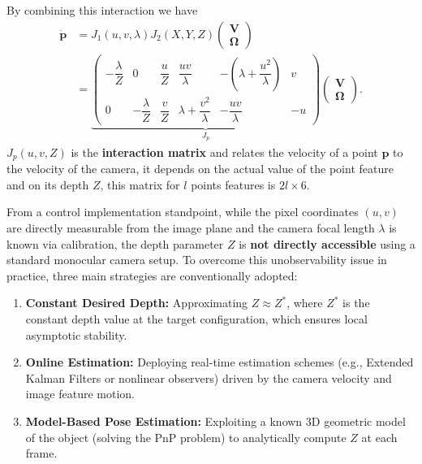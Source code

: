 \documentclass[10pt, a4paper]{report}
\begin{document}
By combining this interaction we have\begin{align}
    \dot{\mathbf p}&=J_1(u,v,\lambda)J_2(X,Y,Z)\begin{pmatrix}
         \mathbf V\\\boldsymbol{\Omega}
    \end{pmatrix}\\[1.5ex]
    &=\underbrace{\begin{pmatrix}
-\dfrac{\lambda}{Z} & 0 & \dfrac{u}{Z} & \dfrac{uv}{\lambda} & -\left(\lambda + \dfrac{u^2}{\lambda}\right) & v \\
0 & -\dfrac{\lambda}{Z} & \dfrac{v}{Z} & \lambda + \dfrac{v^2}{\lambda} & -\dfrac{uv}{\lambda} & -u
\end{pmatrix}}_{J_p}\begin{pmatrix}
         \mathbf V\\\boldsymbol{\Omega}
    \end{pmatrix}.
\end{align}
$J_p(u,v,Z)$ is the \textbf{interaction matrix} and relates the velocity of a point $\mathbf p$ to the velocity of the camera, it depends on the actual value of the point feature and on its depth $Z$, this matrix for $l$ points features is $2l\times 6$.
\begin{boxobservation}{}{}
    From a control implementation standpoint, while the pixel coordinates $(u, v)$ are directly measurable from the image plane and the camera focal length $\lambda$ is known via calibration, the depth parameter $Z$ is \textbf{not directly accessible} using a standard monocular camera setup.
    To overcome this unobservability issue in practice, three main strategies are conventionally adopted:
\begin{enumerate}
    \item \textbf{Constant Desired Depth:} Approximating $Z \approx Z^*$, where $Z^*$ is the constant depth value at the target configuration, which ensures local asymptotic stability.
    \item \textbf{Online Estimation:} Deploying real-time estimation schemes (e.g., Extended Kalman Filters or nonlinear observers) driven by the camera velocity and image feature motion.
    \item \textbf{Model-Based Pose Estimation:} Exploiting a known 3D geometric model of the object (solving the PnP problem) to analytically compute $Z$ at each frame.
\end{enumerate}
\end{boxobservation}
\end{document}

